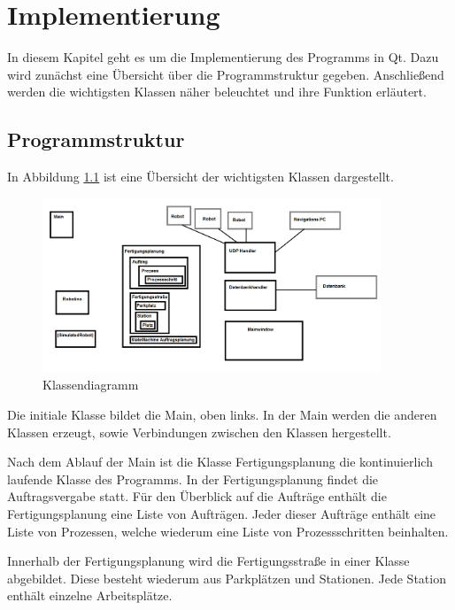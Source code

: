 
\chapter{Implementierung}
\label{sec:Implementierung}

In diesem Kapitel geht es um die Implementierung des Programms in Qt. Dazu wird zunächst eine Übersicht über die Programmstruktur gegeben. Anschließend werden die wichtigsten Klassen näher beleuchtet und ihre Funktion erläutert. 

\section{Programmstruktur}

In Abbildung \ref{fig:Klassendiagramm} ist eine Übersicht der wichtigsten Klassen dargestellt. 

\begin{figure}[htb]
    \centering
    \includegraphics[width=0.9\textwidth]{Abbildungen/Klassendiagramm.PNG}
    \caption{Klassendiagramm}		
    \label{fig:Klassendiagramm}
\end{figure}

Die initiale Klasse bildet die Main, oben links. In der Main werden die anderen Klassen erzeugt, sowie Verbindungen zwischen den Klassen hergestellt.

Nach dem Ablauf der Main ist die Klasse Fertigungsplanung die kontinuierlich laufende Klasse des Programms. In der Fertigungsplanung findet die Auftragsvergabe statt. Für den Überblick auf die Aufträge enthält die Fertigungsplanung eine Liste von Aufträgen. Jeder dieser Aufträge enthält eine Liste von Prozessen, welche wiederum eine Liste von Prozessschritten beinhalten. 

Innerhalb der Fertigungsplanung wird die Fertigungsstraße in einer Klasse abgebildet. Diese besteht wiederum aus Parkplätzen und Stationen. Jede Station enthält einzelne Arbeitsplätze. 

